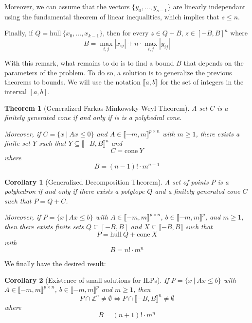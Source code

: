 \documentclass{article}
\newcommand{\cone}{\mathrm{cone}}
\newcommand{\hull}{\mathrm{hull}}
\newcommand{\ints}{\mathbb{Z}}
\newcommand{\ifff}{if and only if}
\newtheorem{theorem}{Theorem}
\newtheorem{corollary}{Corollary}
\begin{document}
Moreover, we can assume that the vectors $\{y_0, ..., y_{s-1}\}$ are linearly
independant using the fundamental theorem of linear inequalities, which implies
that $s \leqslant n$.

Finally, if $Q = \hull~\{x_0, ..., x_{k-1}\}$, then for every
$z \in Q + B$, $z \in [-B, B]^n$ where
$$B = \max_{i, j} |x_{ij}| + n \cdot \max_{i, j} |y_{ij}|$$


With this remark, what remains to do is to find a bound $B$ that depends on the
parameters of the problem. To do so, a solution is to generalize the previous
theorems to bounds. %
We will use the notation
$\llbracket a, b \rrbracket$ for the set of integers in the interval $[a, b]$.

\begin{theorem}[Generalized Farkas-Minkowsky-Weyl Theorem]
  A set $C$ is a finitely generated cone \ifff{} is is a polyhedral cone.

  Moreover, if $C = \{x~|~Ax \leqslant 0\}$ and
  $A \in \llbracket -m, m \rrbracket^{p \times n}$ with $m \geqslant 1$,
  there exists a finite set $Y$ such that
  $Y \subseteq \llbracket -B, B \rrbracket^n$
  and $$C = \cone~Y$$ where
  $$B = (n - 1)! \cdot m^{n-1}$$
\end{theorem}

\begin{corollary}[Generalized Decomposition Theorem]
  A set of points $P$ is a polyhedron \ifff{} there exists a polytope $Q$ and a
  finitely generated cone $C$ such that $P = Q + C$.

  Moreover, if $P = \{x~|~Ax \leqslant b\}$ with
  $A \in \llbracket -m, m \rrbracket^{p \times n}$,
  $b \in \llbracket -m, m \rrbracket^p$, and $m \geqslant 1$,
  then there exists finite sets
  $Q \subseteq [-B, B]$ and $X \subseteq \llbracket -B, B \rrbracket$ such that
  $$P = \hull~Q + \cone~X$$ with $$B = n! \cdot m^n$$
\end{corollary}

We finally have the desired result:

\begin{corollary}[Existence of small solutions for ILPs]
  \label{small-ilp}
  If $P = \{x~|~Ax \leqslant b\}$ with
  $A \in \llbracket -m, m \rrbracket^{p \times n}$,
  $b \in \llbracket -m, m \rrbracket^p$ and $m \geqslant 1$, then
  $$P \cap \ints^n \neq \emptyset \Longleftrightarrow
  P \cap \llbracket -B, B \rrbracket^n \neq \emptyset$$ where
  $$B = (n + 1)! \cdot m^n$$
\end{corollary}
\end{document}
